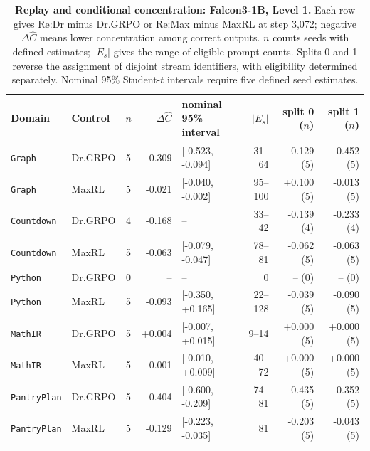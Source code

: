 \begin{table}[!htbp]
\centering
\scriptsize
\setlength{\tabcolsep}{3pt}
\begin{tabular}{@{}llcrlrrr@{}}
\toprule
Domain & Control & $n$ & $\Delta\widehat C$ & nominal 95\% interval & $|E_s|$ & split 0 ($n$) & split 1 ($n$) \\
\midrule
\texttt{Graph} & Dr.GRPO & 5 & -0.309 & [-0.523, -0.094] & 31--64 & -0.129 (5) & -0.452 (5) \\
\texttt{Graph} & MaxRL & 5 & -0.021 & [-0.040, -0.002] & 95--100 & +0.100 (5) & -0.013 (5) \\
\texttt{Countdown} & Dr.GRPO & 4 & -0.168 & -- & 33--42 & -0.139 (4) & -0.233 (4) \\
\texttt{Countdown} & MaxRL & 5 & -0.063 & [-0.079, -0.047] & 78--81 & -0.062 (5) & -0.063 (5) \\
\texttt{Python} & Dr.GRPO & 0 & -- & -- & 0 & -- (0) & -- (0) \\
\texttt{Python} & MaxRL & 5 & -0.093 & [-0.350, +0.165] & 22--128 & -0.039 (5) & -0.090 (5) \\
\texttt{MathIR} & Dr.GRPO & 5 & +0.004 & [-0.007, +0.015] & 9--14 & +0.000 (5) & +0.000 (5) \\
\texttt{MathIR} & MaxRL & 5 & -0.001 & [-0.010, +0.009] & 40--72 & +0.000 (5) & +0.000 (5) \\
\texttt{PantryPlan} & Dr.GRPO & 5 & -0.404 & [-0.600, -0.209] & 74--81 & -0.435 (5) & -0.352 (5) \\
\texttt{PantryPlan} & MaxRL & 5 & -0.129 & [-0.223, -0.035] & 81 & -0.203 (5) & -0.043 (5) \\
\bottomrule
\end{tabular}
\caption{\textbf{Replay and conditional concentration: Falcon3-1B, Level 1.} Each row gives Re:Dr minus Dr.GRPO or Re:Max minus MaxRL at step 3,072; negative $\Delta\widehat C$ means lower concentration among correct outputs. $n$ counts seeds with defined estimates; $|E_s|$ gives the range of eligible prompt counts. Splits 0 and 1 reverse the assignment of disjoint stream identifiers, with eligibility determined separately. Nominal 95\% Student-$t$ intervals require five defined seed estimates.}
\end{table}

